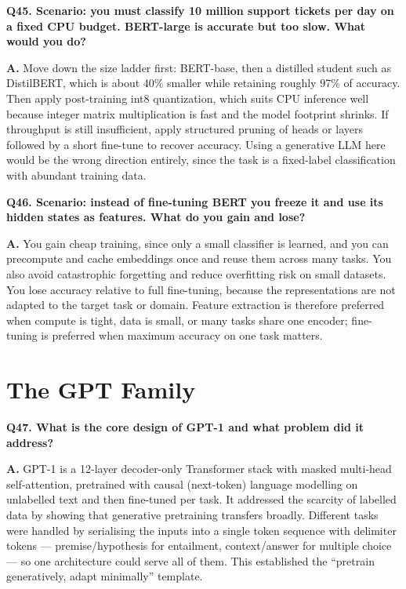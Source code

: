 \documentclass[11pt]{article}
\begin{document}
\medskip
\noindent\textbf{Q45. Scenario: you must classify 10 million support tickets per day on a fixed CPU budget. BERT-large is accurate but too slow. What would you do?}

\noindent\textbf{A.} Move down the size ladder first: BERT-base, then a distilled student such as DistilBERT, which is about 40\% smaller while retaining roughly 97\% of accuracy. Then apply post-training int8 quantization, which suits CPU inference well because integer matrix multiplication is fast and the model footprint shrinks. If throughput is still insufficient, apply structured pruning of heads or layers followed by a short fine-tune to recover accuracy. Using a generative LLM here would be the wrong direction entirely, since the task is a fixed-label classification with abundant training data.

\medskip
\noindent\textbf{Q46. Scenario: instead of fine-tuning BERT you freeze it and use its hidden states as features. What do you gain and lose?}

\noindent\textbf{A.} You gain cheap training, since only a small classifier is learned, and you can precompute and cache embeddings once and reuse them across many tasks. You also avoid catastrophic forgetting and reduce overfitting risk on small datasets. You lose accuracy relative to full fine-tuning, because the representations are not adapted to the target task or domain. Feature extraction is therefore preferred when compute is tight, data is small, or many tasks share one encoder; fine-tuning is preferred when maximum accuracy on one task matters.

\section{The GPT Family}

\noindent\textbf{Q47. What is the core design of GPT-1 and what problem did it address?}

\noindent\textbf{A.} GPT-1 is a 12-layer decoder-only Transformer stack with masked multi-head self-attention, pretrained with causal (next-token) language modelling on unlabelled text and then fine-tuned per task. It addressed the scarcity of labelled data by showing that generative pretraining transfers broadly. Different tasks were handled by serialising the inputs into a single token sequence with delimiter tokens --- premise/hypothesis for entailment, context/answer for multiple choice --- so one architecture could serve all of them. This established the ``pretrain generatively, adapt minimally'' template.
\end{document}
